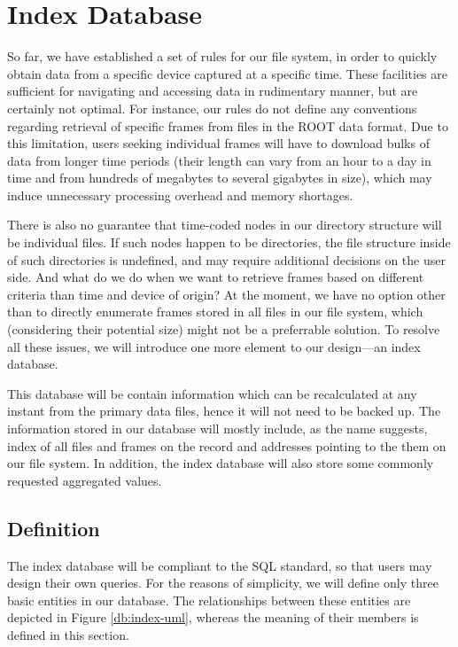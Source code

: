 \section{Index Database}
So far, we have established a set of rules for our file system, in order to quickly obtain data from a specific device captured at a specific time. These facilities are sufficient for navigating and accessing data in rudimentary manner, but are certainly not optimal. For instance, our rules do not define any conventions regarding retrieval of specific frames from files in the ROOT data format. Due to this limitation, users seeking individual frames will have to download bulks of data from longer time periods (their length can vary from an hour to a day in time and from hundreds of megabytes to several gigabytes in size), which may induce unnecessary processing overhead and memory shortages.

There is also no guarantee that time-coded nodes in our directory structure will be individual files. If such nodes happen to be directories, the file structure inside of such directories is undefined, and may require additional decisions on the user side. And what do we do when we want to retrieve frames based on different criteria than time and device of origin? At the moment, we have no option other than to directly enumerate frames stored in all files in our file system, which (considering their potential size) might not be a preferrable solution. To resolve all these issues, we will introduce one more element to our design---an index database.

This database will be contain information which can be recalculated at any instant from the primary data files, hence it will not need to be backed up. The information stored in our database will mostly include, as the name suggests, index of all files and frames on the record and addresses pointing to the them on our file system. In addition, the index database will also store some commonly requested aggregated values.



\subsection{Definition}
The index database will be compliant to the SQL standard, so that users may design their own queries. For the reasons of simplicity, we will define only three basic entities in our database. The relationships between these entities are depicted in Figure \ref{db:index-uml}, whereas the meaning of their members is defined in this section.

